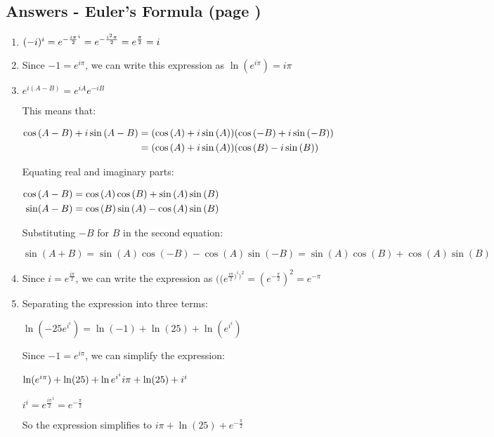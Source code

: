 \documentclass[../main.tex]{subfiles}
\begin{document}
\subsection*{Answers - Euler's Formula (page \pageref{eulersformula})}

\begin{spacing}{1.5}
\begin{enumerate}
    \item 
    \((-i)^i=e^{-\frac{i\pi}{2}^{i}}\\
    =e^{-\frac{i^2 \pi}{2}}\\
    =e^{\frac{\pi}{2}}=i\)

    \item 
    Since \(-1=e^{i \pi}\), we can write this expression as \(\ln{(e^{i \pi})}=i \pi\)

    \item 
    \(e^{i(A-B)}=e^{iA}e^{-iB}\)

    This means that:

    $
    \!
    \begin{aligned}[t]
    \cos{(A-B)+i\sin{(A-B)}}
    &=(\cos{(A)+i\sin{(A)}})(\cos{(-B)+i\sin{(-B)}})\\
    &=(\cos{(A)+i\sin{(A)}})(\cos{(B)-i\sin{(B)}})
    \end{aligned}\\
    $
    
    Equating real and imaginary parts:

    $
    \!
    \begin{aligned}[t]
    \cos{(A-B)}
    &=\cos{(A)}\cos{(B)}+\sin{(A)}\sin{(B)}\\
    \sin(A-B)
    &=\cos{(B)}\sin{(A)}-\cos{(A)}\sin{(B)}\\
    \end{aligned}\\
    $

    Substituting \(-B\) for \(B\) in the second equation:

    \(\sin{(A+B)}=\sin{(A)}\cos{(-B)}-\cos{(A)}\sin{(-B)}=\sin{(A)}\cos{(B)}+\cos{(A)}\sin{(B)}\)

    \item 
    Since \(i=e^{\frac{i \pi}{2}}\), we can write the expression as \(((e^{\frac{i \pi}{2})^i)^2}=(e^{-\frac{\pi}{2}})^2=e^{-\pi}\)

    \item 
    Separating the expression into three terms:

    \(\ln{(-25e^{i^{i}})}=\ln(-1)+\ln(25)+\ln(e^{i^{i}})\)

    Since \(-1=e^{i \pi}\), we can simplify the expression:

    \(\ln(e^{i \pi})+\ln(25)+\ln{e^{i^{i}}}\\
    i \pi + \ln(25) + i^i\)

    \(i^i=e^{\frac{i \pi}{2}^{i}}=e^{-\frac{\pi}{2}}\)

    So the expression simplifies to \(i \pi + \ln(25) + e^{-\frac{\pi}{2}}\)
    
\end{enumerate}
\end{spacing}
\end{document}
